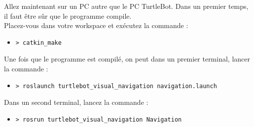 \documentclass[10pt,a4paper]{article}
\begin{document}
\vspace{0.5cm}
Allez maintenant sur un PC autre que le PC TurtleBot. Dans un premier temps, il faut être sûr que le programme compile. \\
Placez-vous dans votre workspace et exécutez la commande :
\begin{itemize}
\item[] \begin{verbatim}> catkin_make \end{verbatim}
\end{itemize}

Une fois que le programme est compilé, on peut dans un premier terminal, lancer la commande :
\begin{itemize}
\item[] \begin{verbatim}> roslaunch turtlebot_visual_navigation navigation.launch \end{verbatim}
\end{itemize}

Dans un second terminal, lancez la commande :
\begin{itemize}
\item[] \begin{verbatim}> rosrun turtlebot_visual_navigation Navigation \end{verbatim}
\end{itemize}
\end{document}
